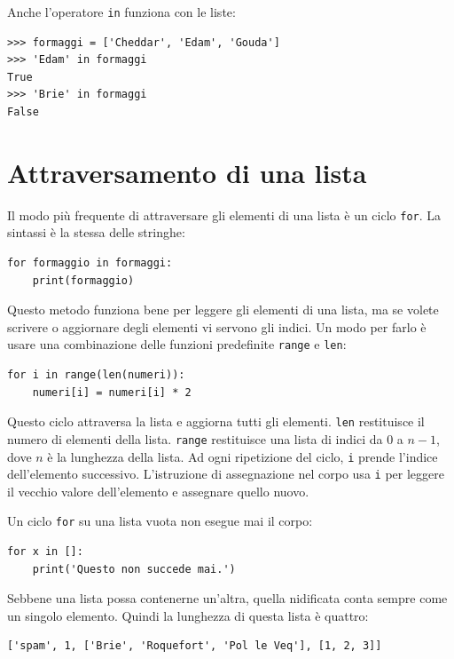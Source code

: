 \documentclass[10pt]{book}
\begin{document}
Anche l'operatore {\tt in} funziona con le liste:

\begin{verbatim}
>>> formaggi = ['Cheddar', 'Edam', 'Gouda']
>>> 'Edam' in formaggi
True
>>> 'Brie' in formaggi
False
\end{verbatim}


\section{Attraversamento di una lista}

Il modo più frequente di attraversare gli elementi di una lista è un ciclo {\tt for}. La sintassi è la stessa delle stringhe:

\begin{verbatim}
for formaggio in formaggi:
    print(formaggio)
\end{verbatim}
%
Questo metodo funziona bene per leggere gli elementi di una lista, ma se volete scrivere o aggiornare degli elementi vi servono gli indici. Un modo per farlo è usare una combinazione delle funzioni predefinite {\tt range} e {\tt len}:

\begin{verbatim}
for i in range(len(numeri)):
    numeri[i] = numeri[i] * 2
\end{verbatim}
%
Questo ciclo attraversa la lista e aggiorna tutti gli elementi. {\tt len}
restituisce il numero di elementi della lista.  {\tt range} restituisce una lista di indici da 0 a $n-1$, dove $n$ è la lunghezza della lista. Ad ogni ripetizione del ciclo, {\tt i} prende l'indice dell'elemento successivo. L'istruzione di assegnazione nel corpo usa {\tt i} per leggere il vecchio valore dell'elemento e assegnare quello nuovo.

Un ciclo {\tt for} su una lista vuota non esegue mai il corpo:

\begin{verbatim}
for x in []:
    print('Questo non succede mai.')
\end{verbatim}
%
Sebbene una lista possa contenerne un'altra, quella nidificata conta sempre come un singolo elemento. Quindi la lunghezza di questa lista è quattro:

\begin{verbatim}
['spam', 1, ['Brie', 'Roquefort', 'Pol le Veq'], [1, 2, 3]]
\end{verbatim}
\end{document}
